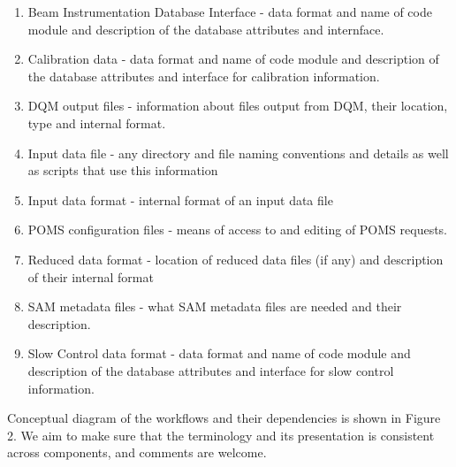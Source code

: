 \documentclass[pdftex,12pt,letter]{article}
\begin{document}
\renewcommand{\theenumi}{\alph{enumi}}
\begin{enumerate}
\item Beam Instrumentation Database Interface - data format and name of code module and description of the database attributes and internface.
\item Calibration data  -  data format and name of code module and description of the database attributes and interface for calibration information.
\item DQM output files - information about files output from DQM, their location, type and internal format.
\item Input data file - any directory and file naming conventions and details as well as scripts that use this information
\item Input data format - internal format of an input data file
\item POMS configuration files - means of access to and editing of POMS requests.
\item Reduced data format - location of reduced data files (if any) and description of their internal format
\item SAM metadata files  - what SAM metadata files are needed and their description.
\item Slow Control data format - data format and name of code module and description of the database attributes and interface for slow control information.
\end{enumerate}
\renewcommand{\theenumi}{\alph{arabic}}

\noindent Conceptual diagram of the workflows and their dependencies is shown in Figure 2. We aim to make sure that the terminology and its presentation is consistent across components, and comments are welcome.
\end{document}
